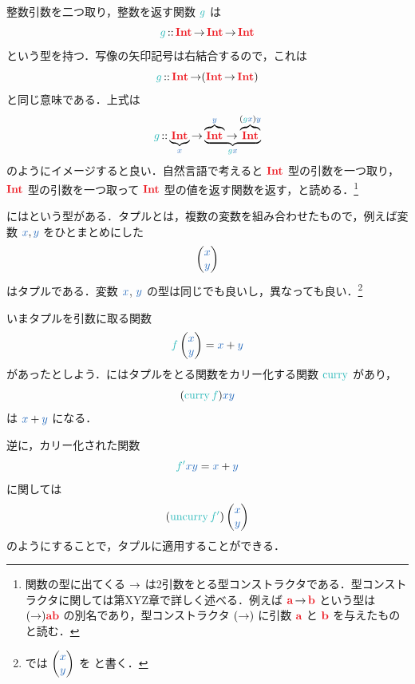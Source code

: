 \documentclass[a5paper,twoside,fleqn,draft]{jsbook}
\begin{document}
整数引数を二つ取り，整数を返す関数 $\hFunc{g}$ は
\begin{equation}
  \hFunc{g}
  \hIsTypeOf\hInt\hFunctionArrow\hInt\hFunctionArrow\hInt
\end{equation}
という型を持つ．写像の矢印記号は右結合するので，これは
\begin{equation}
  \hFunc{g}
  \hIsTypeOf\hInt\hFunctionArrow(\hInt\hFunctionArrow\hInt)
\end{equation}
と同じ意味である．上式は
\begin{equation*}
  \hFunc{g}
  \hIsTypeOf\underbrace{\hInt}_{\hVar{x}}
  \hFunctionArrow\underbrace{\overbrace{\hInt}^{\hVar{y}}\hFunctionArrow\overbrace{\hInt}^{(\hFunc{g}\hVar{x})\hVar{y}}}_{\hFunc{g}\hVar{x}}
\end{equation*}
のようにイメージすると良い．自然言語で考えると $\hInt$ 型の引数を一つ取り，$\hInt$ 型の引数を一つ取って $\hInt$ 型の値を返す関数を返す，と読める．\footnote{関数の型に出てくる $\operatorname{\rightarrow}$ は2引数をとる型コンストラクタである．型コンストラクタに関しては第XYZ章で詳しく述べる．例えば $\hTypeName{a}\hFunctionArrow\hTypeName{b}$ という型は $(\hFunctionArrow)\hTypeName{a}\hTypeName{b}$ の別名であり，型コンストラクタ $(\operatorname{\rightarrow})$ に引数 $\hTypeName{a}$ と $\hTypeName{b}$ を与えたものと読む．}

\separator

\haskell にはという型がある．タプルとは，複数の変数を組み合わせたもので，例えば変数 $\hVar{x},\hVar{y}$ をひとまとめにした
\begin{equation}
  \hPairWith{\hVar{x}}{\hVar{y}}
\end{equation}
はタプルである．変数 $\hVar{x}$, $\hVar{y}$ の型は同じでも良いし，異なっても良い．\footnote{\haskell では $\hPairWith{\hVar{x}}{\hVar{y}}$ を  と書く．}

いまタプルを引数に取る関数
\begin{equation}
  \hFunc{f}\hPairWith{\hVar{x}}{\hVar{y}}
  =\hVar{x}+\hVar{y}
\end{equation}
があったとしよう．\haskell にはタプルをとる関数をカリー化する関数 $\hCurry$ があり，
\begin{equation}
  (\hCurry\hFunc{f})\hVar{x}\hVar{y}
\end{equation}
は $\hVar{x}+\hVar{y}$ になる．

逆に，カリー化された関数
\begin{equation}
  \hFunc{f'}\hVar{x}\hVar{y}
  =\hVar{x}+\hVar{y}
\end{equation}
に関しては
\begin{equation}
  (\hUncurry\hFunc{f'})\hPairWith{\hVar{x}}{\hVar{y}}
\end{equation}
のようにすることで，タプルに適用することができる．
\end{document}
